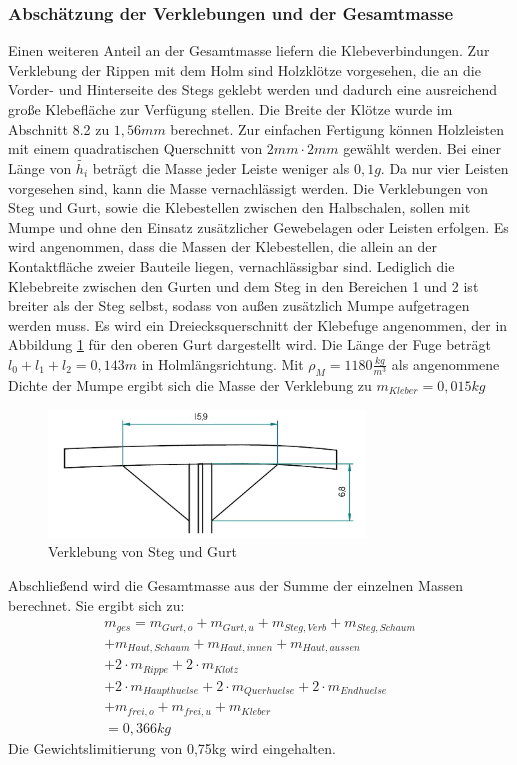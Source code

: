 \subsubsection{Abschätzung der Verklebungen und der Gesamtmasse}
Einen weiteren Anteil an der Gesamtmasse liefern die Klebeverbindungen. Zur Verklebung der Rippen mit dem Holm sind Holzklötze vorgesehen, die an die Vorder- und Hinterseite des Stegs geklebt werden und dadurch eine ausreichend große Klebefläche zur Verfügung stellen. Die Breite der Klötze wurde im Abschnitt 8.2 zu $ 1,56mm $ berechnet. Zur einfachen Fertigung können Holzleisten mit einem quadratischen Querschnitt von $ 2mm\cdot2mm $ gewählt werden. Bei einer Länge von $ \tilde{h_{i}} $ beträgt die Masse jeder Leiste weniger als $ 0,1g $. Da nur vier Leisten vorgesehen sind, kann die Masse vernachlässigt werden. Die Verklebungen von Steg und Gurt, sowie die Klebestellen zwischen den Halbschalen, sollen mit Mumpe und ohne den Einsatz zusätzlicher Gewebelagen oder Leisten erfolgen. Es wird angenommen, dass die Massen der Klebestellen, die allein an der Kontaktfläche zweier Bauteile liegen, vernachlässigbar sind. Lediglich die Klebebreite zwischen den Gurten und dem Steg in den Bereichen 1 und 2 ist breiter als der Steg selbst, sodass von außen zusätzlich Mumpe aufgetragen werden muss. Es wird ein Dreiecksquerschnitt der Klebefuge angenommen, der in Abbildung \ref{fig: Mumpe} für den oberen Gurt dargestellt wird. Die Länge der Fuge beträgt $ l_{0}+l_{1}+l_{2}=0,143m $ in Holmlängsrichtung. Mit $ \rho_{M}=1180\frac{kg}{m^{3}} $ als angenommene Dichte der Mumpe ergibt sich die Masse der Verklebung zu $ m_{Kleber}=0,015kg $\\

\begin{figure}[h]
	\includegraphics[width=0.75\textwidth]{Bilder/Mumpe.jpg}
	\centering
	\caption{Verklebung von Steg und Gurt}
	\label{fig: Mumpe}
\end{figure}

\noindent Abschließend wird die Gesamtmasse aus der Summe der einzelnen Massen berechnet. Sie ergibt sich zu:
\begin{equation}
\begin{array}{l}
	m_{ges}= m_{Gurt,o}+m_{Gurt,u}+m_{Steg,Verb}+m_{Steg,Schaum} \\ +m_{Haut,Schaum}+m_{Haut,innen}+m_{Haut,aussen} \\ +2\cdot m_{Rippe}+2\cdot m_{Klotz} \\
	+2\cdot m_{Haupthuelse}+2\cdot m_{Querhuelse}+2\cdot m_{Endhuelse}\\
	+m_{frei,o}+m_{frei,u}+m_{Kleber}\\
	=0,366kg
\end{array}  
\end{equation}
Die Gewichtslimitierung von 0,75kg wird eingehalten.


